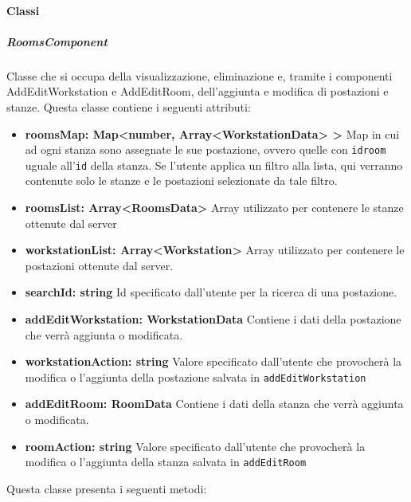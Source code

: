 \paragraph{Classi}
\subparagraph{RoomsComponent}
Classe che si occupa della visualizzazione, eliminazione e, tramite i componenti AddEditWorkstation e AddEditRoom, dell'aggiunta e modifica di postazioni e stanze. \newline
Questa classe contiene i seguenti attributi:
\begin{itemize}
	\item \textbf{roomsMap: Map<number, Array<WorkstationData> >} \newline
		Map in cui ad ogni stanza sono assegnate le sue postazione, ovvero quelle con \texttt{idroom} uguale all'\texttt{id} della stanza. Se l'utente applica un filtro alla lista, qui verranno contenute solo le stanze e le postazioni selezionate da tale filtro.
	\item \textbf{roomsList: Array<RoomsData>} \newline
		Array utilizzato per contenere le stanze ottenute dal server
	\item \textbf{workstationList: Array<Workstation>} \newline
		Array utilizzato per contenere le postazioni ottenute dal server.
	\item \textbf{searchId: string} \newline
		Id specificato dall'utente per la ricerca di una postazione.
	\item \textbf{addEditWorkstation: WorkstationData} \newline
		Contiene i dati della postazione che verrà aggiunta o modificata.
	\item \textbf{workstationAction: string} \newline
		Valore specificato dall'utente che provocherà la modifica o l'aggiunta della postazione salvata in \texttt{addEditWorkstation}
	\item \textbf{addEditRoom: RoomData} \newline
		Contiene i dati della stanza che verrà aggiunta o modificata.
	\item \textbf{roomAction: string} \newline
		Valore specificato dall'utente che provocherà la modifica o l'aggiunta della stanza salvata in \texttt{addEditRoom}
\end{itemize}
Questa classe presenta i seguenti metodi:
